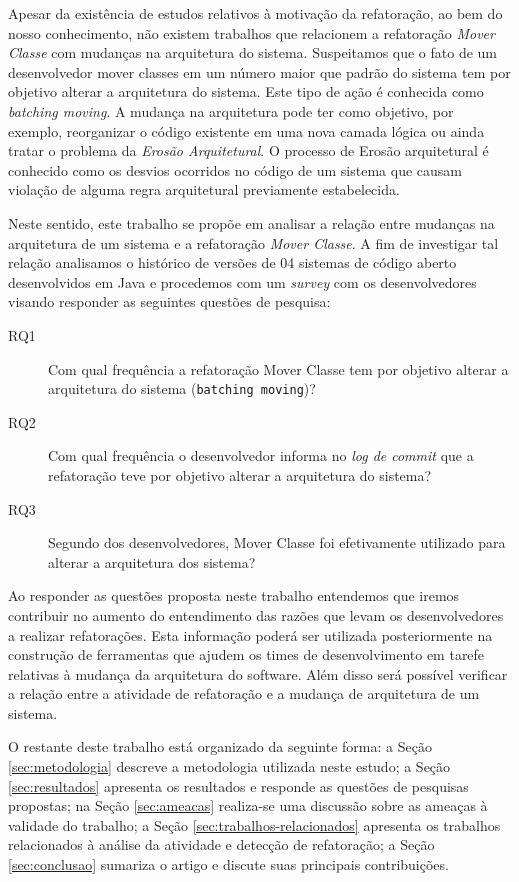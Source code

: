 \documentclass[12pt]{article}
\begin{document}
Apesar da existência de estudos relativos à motivação da refatoração, ao bem do nosso conhecimento, não existem trabalhos que relacionem a refatoração \textit{Mover Classe} com mudanças na arquitetura do sistema. Suspeitamos que o fato de um desenvolvedor mover classes em um número maior que padrão do sistema tem por objetivo alterar a arquitetura do sistema. Este tipo de ação é conhecida como \textit{batching moving}. A mudança na arquitetura pode ter como objetivo, por exemplo, reorganizar o código existente em uma nova camada lógica ou ainda tratar o problema da  \textit{Erosão Arquitetural}. O processo de Erosão arquitetural é conhecido como os desvios ocorridos no código de um sistema que causam violação de alguma regra arquitetural previamente estabelecida\cite{Perry:1992:FSS:141874.141884}.

Neste sentido, este trabalho se propõe em analisar a relação entre mudanças na arquitetura de um sistema e a refatoração \textit{Mover Classe}. A fim de investigar tal relação analisamos o histórico de versões de 04 sistemas de código aberto  desenvolvidos em Java e procedemos com um \textit{survey} com os desenvolvedores visando responder as seguintes questões de pesquisa:

\begin{description}
	\item[RQ1] Com qual frequência a refatoração Mover Classe tem por objetivo alterar a arquitetura do sistema (\texttt{batching moving})?
	\item[RQ2] Com qual frequência o desenvolvedor informa no \textit{log de commit} que a refatoração teve por objetivo alterar a arquitetura do sistema?
	\item[RQ3] Segundo dos desenvolvedores, Mover Classe foi efetivamente utilizado para alterar a arquitetura dos sistema?	
\end{description}

Ao responder as questões proposta neste trabalho entendemos que iremos contribuir no aumento do entendimento das razões que levam os desenvolvedores a realizar refatorações. Esta informação poderá ser utilizada posteriormente na construção de ferramentas que ajudem os times de desenvolvimento em tarefe relativas à mudança da arquitetura do software. Além disso será possível verificar a relação entre a atividade de refatoração e a mudança de arquitetura de um sistema. 

O restante deste trabalho está organizado da seguinte forma: a Seção \ref{sec:metodologia} descreve a metodologia utilizada neste estudo; a Seção \ref{sec:resultados} apresenta os resultados e responde as questões de pesquisas propostas; na Seção \ref{sec:ameacas} realiza-se uma discussão sobre as ameaças à validade do trabalho; a Seção \ref{sec:trabalhos-relacionados} apresenta os trabalhos relacionados à análise da atividade e detecção de refatoração; a Seção \ref{sec:conclusao} sumariza o artigo e discute suas principais contribuições.
\end{document}
